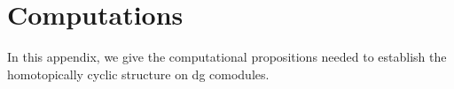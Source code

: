 \chapter{Computations}
In this appendix, we give the 
computational propositions 
needed to establish the 
homotopically cyclic structure 
on dg comodules. 




